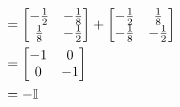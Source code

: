 \begin{solution}
\begin{align}
        &= \begin{bmatrix}-\frac{1}{2} &-\frac{1}{8}\\ \frac{1}{8} & -\frac{1}{2}\end{bmatrix} + \begin{bmatrix}-\frac{1}{2} &\frac{1}{8}\\ -\frac{1}{8} & -\frac{1}{2}\end{bmatrix}\nonumber\\
        &= \begin{bmatrix}-1 &0 \\0 &-1\end{bmatrix}\nonumber\\
        &= -\mathbb{I}\nonumber
    \end{align}
    \alignbreak
\end{solution}

\newpage
